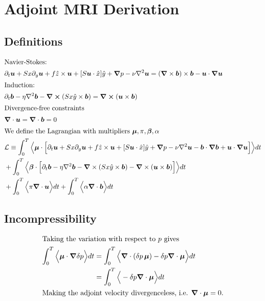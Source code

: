 \documentclass{article}
\renewcommand{\vec}[1]{\boldsymbol{#1}}
\newcommand{\grad}{\vec{\nabla}}
\newcommand{\cross}{\vec{\times}}
\newcommand{\curl}{\grad \vec{\times}}
\newcommand{\laplacian}{\nabla^2}
\begin{document}
\section*{Adjoint MRI Derivation}
\subsection*{Definitions}
\begin{align*}
    \intertext{Navier-Stokes:}
    &\partial_t \vec{u} + Sx\partial_y \vec{u} + f\hat{z}\times\vec{u} + [S\vec{u}\cdot\hat{x}]\hat{y} + \grad p - \nu \laplacian \vec{u} = (\grad \times \vec{b})\times\vec{b} - \vec{u} \cdot \grad\vec{u}\\
    \intertext{Induction:}
    &\partial_t \vec{b} -\eta\laplacian\vec{b} - \grad\cross(Sx\hat{y}\times\vec{b}) = \grad\cross(\vec{u}\times\vec{b}) \\
    \intertext{Divergence-free constraints}
    &\grad\cdot\vec{u} = \grad \cdot\vec{b} = 0\\
    \intertext{We define the Lagrangian with multipliers $\vec{\mu},\pi,\vec{\beta},\alpha$}
    &\mathcal{L} \equiv \int_0^T \Big\langle \vec{\mu}\cdot\Big[ \partial_t \vec{u} + Sx\partial_y \vec{u} + f\hat{z}\times\vec{u} + [S\vec{u}\cdot\hat{x}]\hat{y} + \grad p - \nu \laplacian \vec{u} - \vec{b} \cdot \grad\vec{b} + \vec{u} \cdot \grad\vec{u} \Big] \Big\rangle dt \\
    &+ \int_0^T \Big\langle\vec{\beta}\cdot\Big[ \partial_t \vec{b} - \eta\laplacian\vec{b} - \grad\times(Sx\hat{y}\times\vec{b}) - \grad\times(\vec{u}\times\vec{b})  \Big]  \Big\rangle dt \\
    &+ \int_0^T \Big\langle \pi \grad\cdot\vec{u} \Big\rangle dt + \int_0^T \Big\langle \alpha \grad\cdot\vec{b} \Big\rangle dt
\end{align*}
\newline

\subsection*{Incompressibility}
\begin{align*}
    \intertext{Taking the variation with respect to $p$ gives}
    \int_0^T \Big\langle \vec{\mu} \cdot \grad \delta p \Big\rangle dt &= \int_0^T \Big\langle   \grad \cdot (\delta p\,\vec{\mu})  - \delta p\grad\cdot\vec{\mu}\Big\rangle dt \\
    &= \int_0^T \Big\langle  - \delta p\grad\cdot\vec{\mu}\Big\rangle dt \\
    \intertext{Making the adjoint velocity divergenceless, i.e. $\grad\cdot\vec{\mu} = 0$.}
\end{align*}
\end{document}
